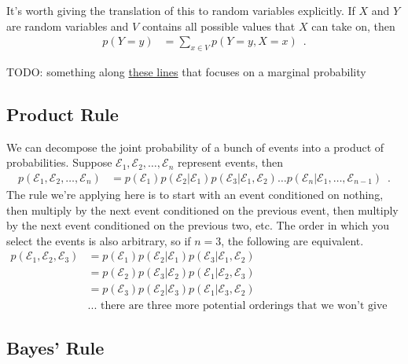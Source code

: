 \documentclass{tufte-handout}
\begin{document}
It's worth giving the translation of this to random variables explicitly.  If $X$ and $Y$ are random variables and $V$ contains all possible values that $X$ can take on, then
\begin{align}
p(Y=y) &= \sum_{x \in V} p(Y=y, X=x) \enspace .
\end{align}

\begin{exercise}
TODO: something along \href{https://www.khanacademy.org/math/ap-statistics/probability-ap/probability-multiplication-rule/e/dependent_probability}{these lines} that focuses on a marginal probability
\end{exercise}

\subsection{Product Rule}

We can decompose the joint probability of a bunch of events into a product of probabilities.  Suppose $\mathcal{E}_1, \mathcal{E}_2, \ldots, \mathcal{E}_n$ represent events, then
\begin{align}
p(\mathcal{E}_1, \mathcal{E}_2, \ldots, \mathcal{E}_n) &= p(\mathcal{E}_1) p(\mathcal{E}_2 | \mathcal{E}_1) p(\mathcal{E}_3 | \mathcal{E}_1, \mathcal{E}_2) \ldots p(\mathcal{E}_n | \mathcal{E}_1, \ldots, \mathcal{E}_{n-1}) \enspace .
\end{align}
The rule we're applying here is to start with an event conditioned on nothing, then multiply by the next event conditioned on the previous event, then multiply by the next event conditioned on the previous two, etc.  The order in which you select the events is also arbitrary, so if $n=3$, the following are equivalent.
\begin{align}
p(\mathcal{E}_1, \mathcal{E}_2, \mathcal{E}_3) &= p(\mathcal{E}_1) p(\mathcal{E}_2|\mathcal{E}_1)p(\mathcal{E}_3|\mathcal{E}_1, \mathcal{E}_2) \nonumber \\
&= p(\mathcal{E}_2) p(\mathcal{E}_3|\mathcal{E}_2)p(\mathcal{E}_1|\mathcal{E}_2, \mathcal{E}_3) \nonumber \\
&= p(\mathcal{E}_3) p(\mathcal{E}_2|\mathcal{E}_3)p(\mathcal{E}_1|\mathcal{E}_3, \mathcal{E}_2) \nonumber \\
&\mbox{... there are three more potential orderings that we won't give explicitly} \nonumber
\end{align}

\subsection{Bayes' Rule}
\end{document}
